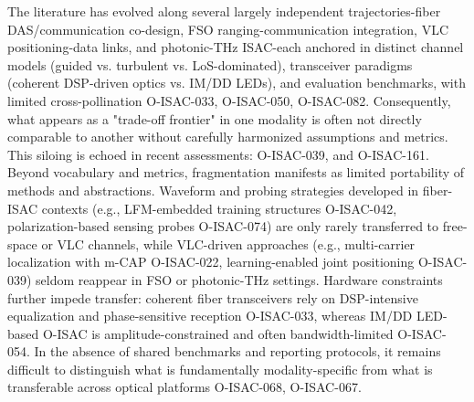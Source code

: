 {} The literature has evolved along several largely independent trajectories-fiber DAS/communication co-design, FSO ranging-communication integration, VLC positioning-data links, and photonic-THz ISAC-each anchored in distinct channel models (guided vs. turbulent vs. LoS-dominated), transceiver paradigms (coherent DSP-driven optics vs. IM/DD LEDs), and evaluation benchmarks, with limited cross-pollination O-ISAC-033, O-ISAC-050, O-ISAC-082. Consequently, what appears as a "trade-off frontier" in one modality is often not directly comparable to another without carefully harmonized assumptions and metrics. This siloing is echoed in recent assessments:  O-ISAC-039, and  O-ISAC-161.\markdownRendererParagraphSeparator
{} Beyond vocabulary and metrics, fragmentation manifests as limited portability of methods and abstractions. Waveform and probing strategies developed in fiber-ISAC contexts (e.g., LFM-embedded training structures O-ISAC-042, polarization-based sensing probes O-ISAC-074) are only rarely transferred to free-space or VLC channels, while VLC-driven approaches (e.g., multi-carrier localization with m-CAP O-ISAC-022, learning-enabled joint positioning O-ISAC-039) seldom reappear in FSO or photonic-THz settings. Hardware constraints further impede transfer: coherent fiber transceivers rely on DSP-intensive equalization and phase-sensitive reception O-ISAC-033, whereas IM/DD LED-based O-ISAC is amplitude-constrained and often bandwidth-limited O-ISAC-054. In the absence of shared benchmarks and reporting protocols, it remains difficult to distinguish what is fundamentally modality-specific from what is transferable across optical platforms O-ISAC-068, O-ISAC-067.\markdownRendererParagraphSeparator
